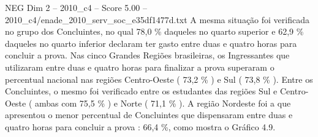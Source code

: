 \begin{textsample}{NEG Dim 2 – 2010\_c4 – Score 5.00 – 2010\_c4/enade\_2010\_serv\_soc\_e35df1477d.txt}
A mesma situação foi verificada no grupo dos Concluintes, no qual 78,0 \% daqueles no quarto superior e 62,9 \% daqueles no quarto inferior declaram ter gasto entre duas e quatro horas para concluir a prova.
Nas cinco Grandes Regiões brasileiras, os Ingressantes que utilizaram entre duas e quatro horas para finalizar a prova superaram o percentual nacional nas regiões Centro-Oeste ( 73,2 \% ) e Sul ( 73,8 \% ).
Entre os Concluintes, o mesmo foi verificado entre os estudantes das regiões Sul e Centro-Oeste ( ambas com 75,5 \% ) e Norte ( 71,1 \% ).
A região Nordeste foi a que apresentou o menor percentual de Concluintes que dispensaram entre duas e quatro horas para concluir a prova : 66,4 \%, como mostra o Gráfico 4.9.

\end{textsample}
